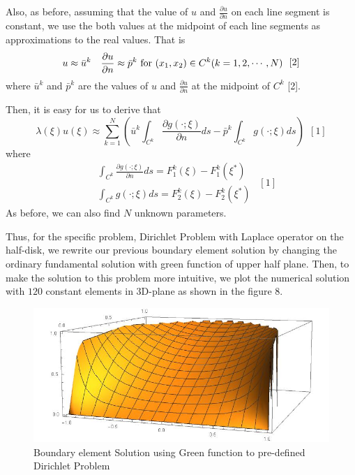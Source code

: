 \documentclass[a4paper,12pt]{article}
\begin{document}
\par Also, as before, assuming that the value of $u$ and $\frac{\partial u}{\partial n}$ on each line segment is constant, we use the both values at the midpoint of each line segments as approximations to the real values. That is 
\begin{equation}
\begin{aligned}
&u \approx \bar{u}^k & \frac{\partial u}{\partial n} \approx \bar{p}^k \ {\rm for }\ (x_1,x_2) \in C^k (k = 1,2,\cdots, N) 
\end{aligned} \ \ [2]
\end{equation}
where $\bar{u}^k$ and $\bar{p}^k$ are the values of $u$ and $\frac{\partial u}{\partial n}$ at the midpoint of $C^k$ [2].
\par Then, it is easy for us to derive that
\begin{equation}
\lambda(\xi) u(\xi) \approx  \sum_{k = 1}^{N} (\bar{u}^{k}\int_{C^k} \frac{\partial g(\cdot;\xi)}{\partial n}ds  - \bar{p}^k\int_{C^k} g(\cdot;\xi)ds )  \ \ [1]
\end{equation}
where 
\begin{equation}
\begin{aligned}
&\int_{C^k} \frac{\partial g(\cdot;\xi)}{\partial n} ds= F_1^k(\xi) - F_1^k(\xi^*)\\
&\int_{C^k} g(\cdot;\xi) ds = F_2^k(\xi) - F_2^k(\xi^*)
\end{aligned} \ \ [1]
\end{equation} 
As before, we can also find $N$ unknown parameters. 

\par Thus, for the specific problem, Dirichlet Problem with Laplace operator on the half-disk, we rewrite our previous boundary element solution by changing the ordinary fundamental solution with green function of upper half plane. Then, to make the solution to this problem more intuitive, we plot the  numerical solution with $120$ constant elements in 3D-plane as shown in the figure 8.

\begin{figure}[H]
\centering
\includegraphics[scale=0.46]{BEM2.jpg}
\caption{Boundary element Solution using Green function to pre-defined Dirichlet Problem}
\end{figure}
\end{document}

